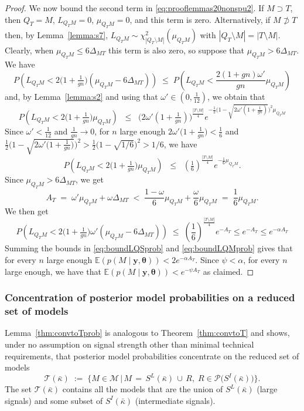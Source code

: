 \documentclass[
  12pt]{article}
\newcommand{\E}{\mathbb{E}}
\newcommand{\M}{\mathcal{M}}
\newcommand{\T}{\mathcal{T}}
\newcommand{\by}{\mathbf{y}}
\newcommand{\btheta}{\boldsymbol{\theta}}
\begin{document}
\begin{proof}
We now bound the second term in \eqref{eq:prooflemmas20nonspu2}. If $M \supset T$, then $Q_T=M$, $L_{Q_TM}=0$, $\mu_{Q_TM}=0$, and this term is zero. Alternatively, if $M \not\supset T$ %
then, by Lemma~\ref{lemma:s7}, $L_{Q_TM} \sim \chi_{|Q_T\setminus M|}^2(\mu_{Q_TM})$ with $|Q_T\setminus M|=|T\setminus M|$.
Clearly, when $\mu_{Q_TM}\leq 6\Delta_{MT}$ this term is also zero, so suppose that $\mu_{Q_TM}> 6\Delta_{MT}$.  
We have  
$$P\left(L_{Q_TM}<2\big(1+\tfrac{1}{gn}\big)(\mu_{Q_TM}-6\Delta_{MT})\right)\; \leq \; P\left(L_{Q_TM}<\frac{2 (1+g n)\omega'}{g n}\mu_{Q_TM}\right)$$ 
and, by Lemma~\ref{lemma:s2} and using that $\omega'\in (0,\tfrac{1}{12})$, we obtain that 
$$P\left(L_{Q_TM}<2\big(1+\tfrac{1}{gn}\big)\mu_{Q_TM}\right) \;\;\leq\;\; \Big(2\omega' (1+\tfrac{1}{g n})\Big)^{\frac{|T\setminus M|}{4}} e^{-\frac{1}{2}\Big(1-\sqrt{2\omega' (1+\frac{1}{g n})}\Big)^2\mu_{Q_TM}}$$
Since $\omega'<\tfrac{1}{12}$ and $\frac{1}{gn} \to 0$, for $n$ large enough $2\omega'\big(1+\frac{1}{gn}\big)<\frac{1}{6}$ and $\frac{1}{2}\Big(1-\sqrt{2\omega'\big(1+\frac{1}{gn}\big)}\Big)^2 >\frac{1}{2}\Big(1-\sqrt{1/6}\Big)^2>1/6$, we have
$$P\left(L_{Q_TM}<2\big(1+\tfrac{1}{gn}\big)\mu_{Q_TM}\right) \;\;\leq\;\;(\tfrac16)^{\frac{|T\setminus M|}{4}}e^{-\frac{1}{6}\mu_{Q_TM}}.$$
Since $\mu_{Q_TM}>6\Delta_{MT}$, we get
$$
A_T\;=\;\omega'\mu_{Q_TM}+\omega\Delta_{MT}\;<\;\frac{1-\omega}{6}\mu_{Q_TM}+\frac{\omega}{6}\mu_{Q_TM}\;=\;\frac16\mu_{Q_TM}.
$$
We then get
\begin{equation}\label{eq:boundLQMprob}
    P\left(L_{Q_TM}<2\big(1+\tfrac{1}{gn}\big)\omega'(\mu_{Q_TM}-6\Delta_{MT})\right) \;\leq\; \left(\frac16\right)^{\frac{|T\setminus M|}{4}}e^{-A_T} \leq e^{-A_T}\leq e^{-\alpha A_T}
\end{equation}
Summing the bounds in \eqref{eq:boundLQSprob} and \eqref{eq:boundLQMprob} gives that for every $n$ large enough $\E\left(p(M\mid \by,\btheta)\right) < 2e^{-\alpha A_T}$. Since $\psi<\alpha$, for every $n$ large enough, we have that $\E\left(p(M\mid \by,\btheta)\right) < e^{-\psi A_T}$ as claimed.
\end{proof}

\subsubsection{Concentration of posterior model probabilities on a reduced set of models}

Lemma~\ref{thm:convtoTprob} is analogous to Theorem~\ref{thm:convtoT} and shows, under no assumption on signal strength other than minimal technical requirements, that posterior model probabilities concentrate on the reduced set of models
\begin{equation}\label{eq:Tkappaprob}
    \T(\bar{\kappa}) \;:=\;\Big\{M \in \M \,\big|\, M\,=\, S^L(\bar{\kappa})\,\cup\,R,\; R\in \mathcal{P}\big(S^{I}(\bar{\kappa})\big)  \Big\}.
\end{equation}
The set $\T(\bar{\kappa})$ contains all the models that are the union of $S^L(\bar{\kappa})$ (large signals) and some subset of $S^{I}(\bar{\kappa})$ (intermediate signals).
\end{document}
